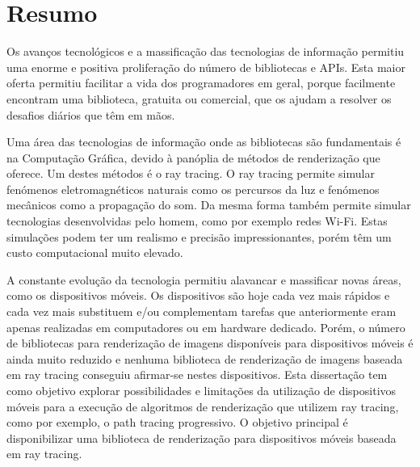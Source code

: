\documentclass[
  oneside,
  11pt, a4paper,
  footinclude=true,
  headinclude=true,
  cleardoublepage=empty,
  bibliography=totocnumbered
]{scrbook}
\begin{document}
\chapter*{Resumo}

\par
Os avanços tecnológicos e a massificação das tecnologias de informação permitiu uma enorme e positiva proliferação do número de bibliotecas e APIs.
Esta maior oferta permitiu facilitar a vida dos programadores em geral, porque facilmente encontram uma biblioteca, gratuita ou comercial, que os ajudam a resolver os desafios diários que têm em mãos.

\par
Uma área das tecnologias de informação onde as bibliotecas são fundamentais é na Computação Gráfica, devido à panóplia de métodos de renderização que oferece.
Um destes métodos é o ray tracing.
O ray tracing permite simular fenómenos eletromagnéticos naturais como os percursos da luz e fenómenos mecânicos como a propagação do som.
Da mesma forma também permite simular tecnologias desenvolvidas pelo homem, como por exemplo redes Wi-Fi.
Estas simulações podem ter um realismo e precisão impressionantes, porém têm um custo computacional muito elevado.

\par
A constante evolução da tecnologia permitiu alavancar e massificar novas áreas, como os dispositivos móveis.
Os dispositivos são hoje cada vez mais rápidos e cada vez mais substituem e/ou complementam tarefas que anteriormente eram apenas realizadas em computadores ou em hardware dedicado.
Porém, o número de bibliotecas para renderização de imagens disponíveis para dispositivos móveis é ainda muito reduzido e nenhuma biblioteca de renderização de imagens baseada em ray tracing conseguiu afirmar-se nestes dispositivos.
Esta dissertação tem como objetivo explorar possibilidades e limitações da utilização de dispositivos móveis para a execução de algoritmos de renderização que utilizem ray tracing, como por exemplo, o path tracing progressivo.
O objetivo principal é disponibilizar uma biblioteca de renderização para dispositivos móveis baseada em ray tracing.
	
\tableofcontents
\listoffigures
\listoftables
\clearpage
\thispagestyle{empty}



\end{document}
